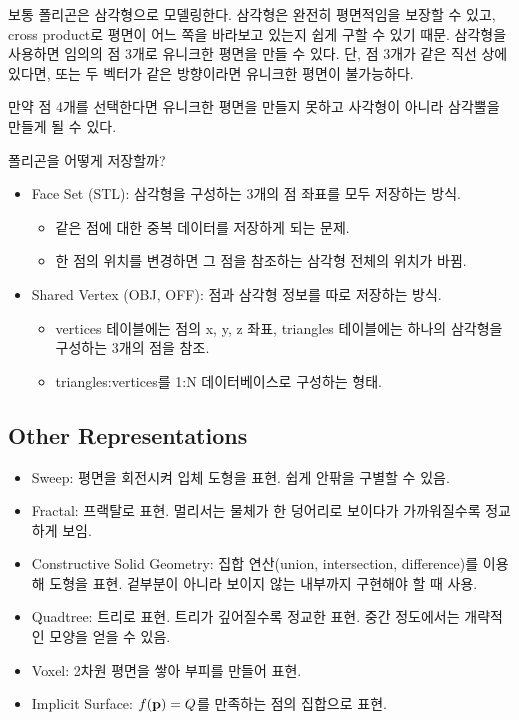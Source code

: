 보통 폴리곤은 삼각형으로 모델링한다. 삼각형은 완전히 평면적임을 보장할 수 있고, cross product로 평면이 어느 쪽을 바라보고 있는지 쉽게 구할 수 있기 때문. 삼각형을 사용하면 임의의 점 3개로 유니크한 평면을 만들 수 있다. 단, 점 3개가 같은 직선 상에 있다면, 또는 두 벡터가 같은 방향이라면 유니크한 평면이 불가능하다.

만약 점 4개를 선택한다면 유니크한 평면을 만들지 못하고 사각형이 아니라 삼각뿔을 만들게 될 수 있다.

폴리곤을 어떻게 저장할까?

\begin{itemize}
  \item Face Set (STL): 삼각형을 구성하는 3개의 점 좌표를 모두 저장하는 방식.
    \begin{itemize}
      \item 같은 점에 대한 중복 데이터를 저장하게 되는 문제.
      \item 한 점의 위치를 변경하면 그 점을 참조하는 삼각형 전체의 위치가 바뀜.
    \end{itemize}
  \item Shared Vertex (OBJ, OFF): 점과 삼각형 정보를 따로 저장하는 방식.
    \begin{itemize}
      \item vertices 테이블에는 점의 x, y, z 좌표, triangles 테이블에는 하나의 삼각형을 구성하는 3개의 점을 참조.
      \item triangles:vertices를 1:N 데이터베이스로 구성하는 형태.
    \end{itemize}
\end{itemize}

\subsection{Other Representations}

\begin{itemize}
  \item Sweep: 평면을 회전시켜 입체 도형을 표현. 쉽게 안팎을 구별할 수 있음.
  \item Fractal: 프랙탈로 표현. 멀리서는 물체가 한 덩어리로 보이다가 가까워질수록 정교하게 보임.
  \item Constructive Solid Geometry: 집합 연산(union, intersection, difference)를 이용해 도형을 표현. 겉부분이 아니라 보이지 않는 내부까지 구현해야 할 때 사용.
  \item Quadtree: 트리로 표현. 트리가 깊어질수록 정교한 표현. 중간 정도에서는 개략적인 모양을 얻을 수 있음.
  \item Voxel: 2차원 평면을 쌓아 부피를 만들어 표현.
  \item Implicit Surface: $f(\bold{p}) = Q$를 만족하는 점의 집합으로 표현.
\end{itemize}

